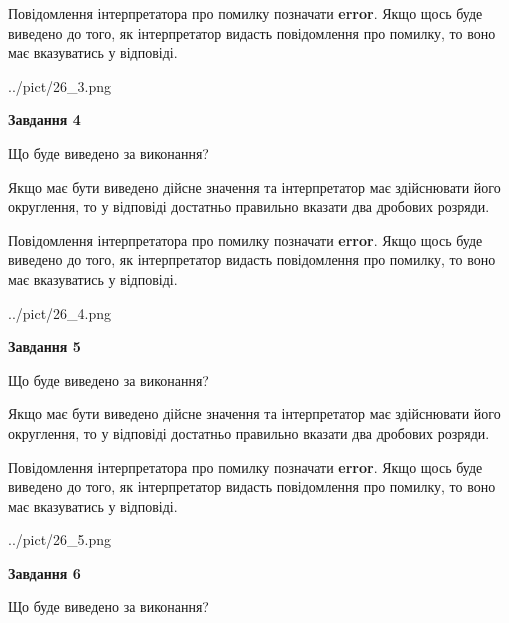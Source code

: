 \documentclass[12pt, ukrainian]{article}
\begin{document}
{\begin {Large}
Повідомлення інтерпретатора про помилку позначати \textbf{error}.
Якщо щось буде виведено до того, як інтерпретатор видасть повідомлення про помилку, 
то воно має вказуватись у відповіді. \par

\begin{center}
	{../pict/26_3.png}
\end{center}
\newpage

{\begin {center}\textbf{Завдання 4}\end {center}}\par
Що буде виведено за виконання? \par

Якщо має бути виведено дійсне значення та інтерпретатор має здійснювати його округлення, 
то у відповіді достатньо правильно вказати два дробових розряди.

Повідомлення інтерпретатора про помилку позначати \textbf{error}.
Якщо щось буде виведено до того, як інтерпретатор видасть повідомлення про помилку, 
то воно має вказуватись у відповіді. \par

\begin{center}
	{../pict/26_4.png}
\end{center}
\newpage

{\begin {center}\textbf{Завдання 5}\end {center}}\par
Що буде виведено за виконання? \par

Якщо має бути виведено дійсне значення та інтерпретатор має здійснювати його округлення, 
то у відповіді достатньо правильно вказати два дробових розряди.

Повідомлення інтерпретатора про помилку позначати \textbf{error}.
Якщо щось буде виведено до того, як інтерпретатор видасть повідомлення про помилку, 
то воно має вказуватись у відповіді. \par

\begin{center}
	{../pict/26_5.png}
\end{center}
\newpage

{\begin {center}\textbf{Завдання 6}\end {center}}\par
Що буде виведено за виконання? \par


\end{Large}}
\end{document}
